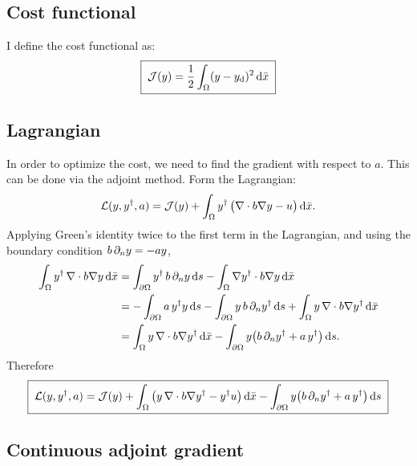 \subsection{Cost functional} 
I define the cost functional as: 
\begin{equation}
\boxed{\;
\mathcal{J}(y)=\frac12\int_\Omega (y-y_{\mathrm{d}})^2\,\mathrm{d}\bar{x} \;}
\end{equation}


\subsection{Lagrangian}
In order to optimize the cost, we need to find the gradient with respect to $a$. This can be done via the adjoint method. Form the Lagrangian:
\begin{equation}
\mathcal{L}(y,y^{\dagger},a)=\mathcal{J}(y)+\int_\Omega y^{\dagger}\,\big(\nabla\cdot b\nabla y-u\big)\,\mathrm{d}\bar{x} .
\end{equation}
Applying Green's identity twice to the first term in the Lagrangian, and using the boundary condition
$b\,\partial_{n} y=-a y$,
\begin{align*}
\int_\Omega y^{\dagger}\,\nabla\cdot b\nabla y\,\mathrm{d}\bar{x}
&=\int_{\partial\Omega}y^{\dagger}\, b\,\partial_{n} y\,\mathrm{d} s-\int_\Omega\nabla y^{\dagger}\cdot b\nabla y\,\mathrm{d}\bar{x} \nonumber\\
&=-\int_{\partial\Omega}a\,y^{\dagger} y\,\mathrm{d} s-\int_{\partial\Omega}y\,b\,\partial_{n}y^{\dagger}\,\mathrm{d} s+\int_\Omega y\,\nabla\cdot b\nabla y^{\dagger}\,\mathrm{d}\bar{x} \nonumber\\
&=\int_\Omega y\,\nabla\cdot b\nabla y^{\dagger}\,\mathrm{d}\bar{x}-\int_{\partial\Omega}y\big(b\,\partial_{n}y^{\dagger}+a\,y^{\dagger}\big)\,\mathrm{d} s .
\end{align*}
Therefore
\begin{equation}
\boxed{\;
\mathcal{L}(y,y^{\dagger},a)=\mathcal{J}(y)+\int_\Omega\big(y\,\nabla\cdot b\nabla y^{\dagger}-y^{\dagger} u\big)\,\mathrm{d}\bar{x}
-\int_{\partial\Omega}y\big(b\,\partial_{n}y^{\dagger}+a\,y^{\dagger}\big)\,\mathrm{d} s\;}
\end{equation}


\subsection{Continuous adjoint gradient}
